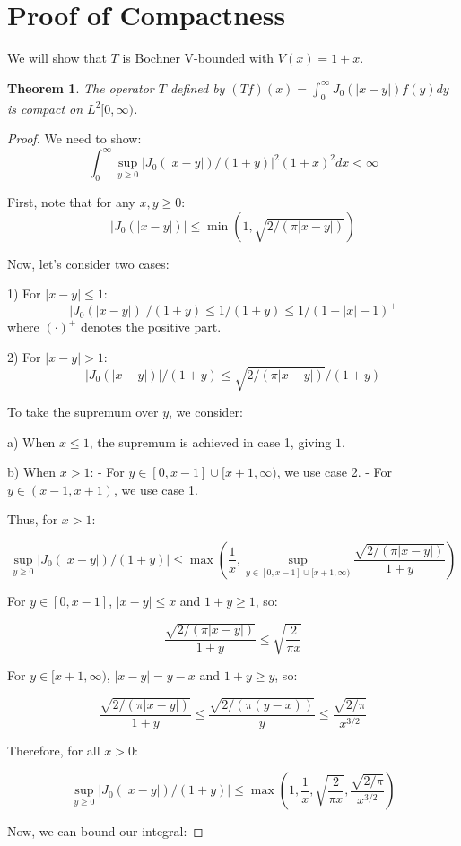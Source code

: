 \documentclass{article}
\newtheorem{theorem}{Theorem}
\begin{document}
\section{Proof of Compactness}

We will show that $T$ is Bochner V-bounded with $V(x) = 1 + x$.

\begin{theorem}
The operator $T$ defined by $(Tf)(x) = \int_0^\infty J_0(|x-y|)f(y)dy$ is compact on $L^2[0,\infty)$.
\end{theorem}

\begin{proof}
We need to show:
\[\int_0^\infty \sup_{y\geq0} |J_0(|x-y|)/(1+y)|^2 (1+x)^2 dx < \infty\]

First, note that for any $x, y \geq 0$:
\[|J_0(|x-y|)| \leq \min(1, \sqrt{2/(\pi|x-y|)})\]

Now, let's consider two cases:

1) For $|x-y| \leq 1$:
   \[|J_0(|x-y|)|/(1+y) \leq 1/(1+y) \leq 1/(1+|x|-1)^+\]
   where $(\cdot)^+$ denotes the positive part.

2) For $|x-y| > 1$:
   \[|J_0(|x-y|)|/(1+y) \leq \sqrt{2/(\pi|x-y|)}/(1+y)\]

To take the supremum over $y$, we consider:

a) When $x \leq 1$, the supremum is achieved in case 1, giving $1$.

b) When $x > 1$:
   - For $y \in [0, x-1] \cup [x+1, \infty)$, we use case 2.
   - For $y \in (x-1, x+1)$, we use case 1.

Thus, for $x > 1$:

\[\sup_{y\geq0} |J_0(|x-y|)/(1+y)| \leq \max\left(\frac{1}{x}, \sup_{y \in [0,x-1] \cup [x+1,\infty)} \frac{\sqrt{2/(\pi|x-y|)}}{1+y}\right)\]

For $y \in [0,x-1]$, $|x-y| \leq x$ and $1+y \geq 1$, so:

\[\frac{\sqrt{2/(\pi|x-y|)}}{1+y} \leq \sqrt{\frac{2}{\pi x}}\]

For $y \in [x+1,\infty)$, $|x-y| = y-x$ and $1+y \geq y$, so:

\[\frac{\sqrt{2/(\pi|x-y|)}}{1+y} \leq \frac{\sqrt{2/(\pi(y-x))}}{y} \leq \frac{\sqrt{2/\pi}}{x^{3/2}}\]

Therefore, for all $x > 0$:

\[\sup_{y\geq0} |J_0(|x-y|)/(1+y)| \leq \max\left(1, \frac{1}{x}, \sqrt{\frac{2}{\pi x}}, \frac{\sqrt{2/\pi}}{x^{3/2}}\right)\]

Now, we can bound our integral:


\end{proof}
\end{document}
